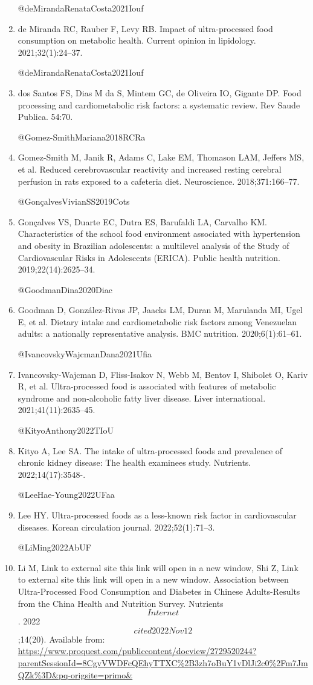 \documentclass[
]{article}
\begin{document}
\begin{enumerate}
  @deMirandaRenataCosta2021Iouf
\item
  de Miranda RC, Rauber F, Levy RB. Impact of ultra-processed food
  consumption on metabolic health. Current opinion in lipidology.
  2021;32(1):24--37.

  @deMirandaRenataCosta2021Iouf
\item
  dos Santos FS, Dias M da S, Mintem GC, de Oliveira IO, Gigante DP.
  Food processing and cardiometabolic risk factors: a systematic review.
  Rev Saude Publica. 54:70.

  @Gomez-SmithMariana2018RCRa
\item
  Gomez-Smith M, Janik R, Adams C, Lake EM, Thomason LAM, Jeffers MS, et
  al. Reduced cerebrovascular reactivity and increased resting cerebral
  perfusion in rats exposed to a cafeteria diet. Neuroscience.
  2018;371:166--77.

  @GonçalvesVivianSS2019Cots
\item
  Gonçalves VS, Duarte EC, Dutra ES, Barufaldi LA, Carvalho KM.
  Characteristics of the school food environment associated with
  hypertension and obesity in Brazilian adolescents: a multilevel
  analysis of the Study of Cardiovascular Risks in Adolescents (ERICA).
  Public health nutrition. 2019;22(14):2625--34.

  @GoodmanDina2020Diac
\item
  Goodman D, González-Rivas JP, Jaacks LM, Duran M, Marulanda MI, Ugel
  E, et al. Dietary intake and cardiometabolic risk factors among
  Venezuelan adults: a nationally representative analysis. BMC
  nutrition. 2020;6(1):61--61.

  @IvancovskyWajcmanDana2021Ufia
\item
  Ivancovsky‐Wajcman D, Fliss‐Isakov N, Webb M, Bentov I, Shibolet O,
  Kariv R, et al. Ultra‐processed food is associated with features of
  metabolic syndrome and non‐alcoholic fatty liver disease. Liver
  international. 2021;41(11):2635--45.

  @KityoAnthony2022TIoU
\item
  Kityo A, Lee SA. The intake of ultra-processed foods and prevalence of
  chronic kidney disease: The health examinees study. Nutrients.
  2022;14(17):3548-.

  @LeeHae-Young2022UFaa
\item
  Lee HY. Ultra-processed foods as a less-known risk factor in
  cardiovascular diseases. Korean circulation journal. 2022;52(1):71--3.

  @LiMing2022AbUF
\item
  Li M, Link to external site this link will open in a new window, Shi
  Z, Link to external site this link will open in a new window.
  Association between Ultra-Processed Food Consumption and Diabetes in
  Chinese Adults-Results from the China Health and Nutrition Survey.
  Nutrients \[Internet\]. 2022 \[cited 2022 Nov 12\];14(20). Available
  from:
  \url{https://www.proquest.com/publiccontent/docview/2729520244?parentSessionId=8CgvVWDFcQEhyTTXC\%2B3zh7oBuY1vDlJi2c0\%2Fm7JmQZk\%3D\&pq-origsite=primo\&}


\end{enumerate}
\end{document}
